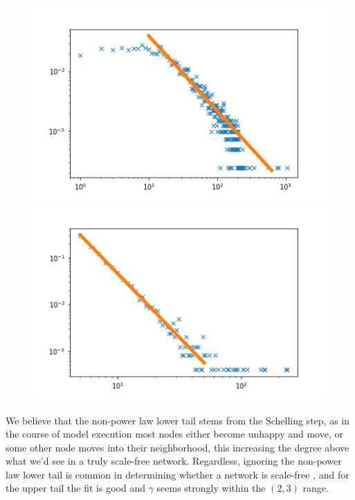 \documentclass[12pt,twoside]{report}
\begin{document}
\begin{figure}[H]
\begin{center}
\begin{minipage}{0.45\linewidth}
\includegraphics[width=\linewidth]{figures/degs/facebook.png}
\end{minipage}
\hfill
\begin{minipage}{0.45\linewidth}
\includegraphics[width=\linewidth]{figures/degs/ba.png}
\end{minipage}
\end{center}
\end{figure}

We believe that the non-power law lower tail stems from the Schelling step, as in the course of model execution most nodes either become unhappy and move, or some other node moves into their neighborhood, this increasing the degree above what we'd see in a truly scale-free network. Regardless, ignoring the non-power law lower tail is common in determining whether a network is scale-free \cite{broido2019scale}, and for the upper tail the fit is good and $\gamma$ seems strongly within the $(2,3)$ range. \\
\end{document}
